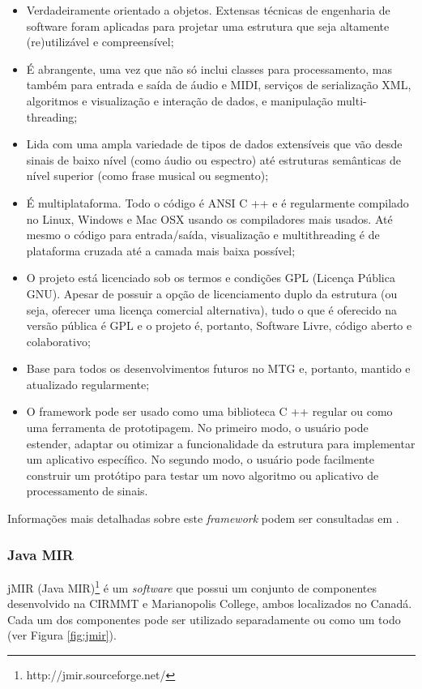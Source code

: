 \begin{itemize}
    \item Verdadeiramente orientado a objetos. Extensas técnicas de engenharia de software foram aplicadas para projetar uma estrutura que seja altamente (re)utilizável e compreensível;
    \item É abrangente, uma vez que não só inclui classes para processamento, mas também para entrada e saída de áudio e MIDI, serviços de serialização XML, algoritmos e visualização e interação de dados, e manipulação multi-threading;
    \item Lida com uma ampla variedade de tipos de dados extensíveis que vão desde sinais de baixo nível (como áudio ou espectro) até estruturas semânticas de nível superior (como frase musical ou segmento);
    \item É multiplataforma. Todo o código é ANSI C ++ e é regularmente compilado no Linux, Windows e Mac OSX usando os compiladores mais usados. Até mesmo o código para entrada/saída, visualização e multithreading é de plataforma cruzada até a camada mais baixa possível;
    \item O projeto está licenciado sob os termos e condições GPL (Licença Pública GNU). Apesar de possuir a opção de licenciamento duplo da estrutura (ou seja, oferecer uma licença comercial alternativa), tudo o que é oferecido na versão pública é GPL e o projeto é, portanto, Software Livre, código aberto e colaborativo;
    \item Base para todos os desenvolvimentos futuros no MTG e, portanto, mantido e atualizado regularmente;
    \item O framework pode ser usado como uma biblioteca C ++ regular ou como uma ferramenta de prototipagem. No primeiro modo, o usuário pode estender, adaptar ou otimizar a funcionalidade da estrutura para implementar um aplicativo específico. No segundo modo, o usuário pode facilmente construir um protótipo para testar um novo algoritmo ou aplicativo de processamento de sinais.
\end{itemize}

Informações mais detalhadas sobre este \textit{framework} podem ser consultadas em \cite{amatriain2007, amatriain2004}.

\subsubsection{Java MIR} \label{subsec:jmir}
jMIR (Java MIR)\footnote{http://jmir.sourceforge.net/} é um \textit{software} que possui um conjunto de componentes desenvolvido na CIRMMT e Marianopolis College, ambos localizados no Canadá. Cada um dos componentes pode ser utilizado separadamente ou como um todo (ver Figura \ref{fig:jmir}).

